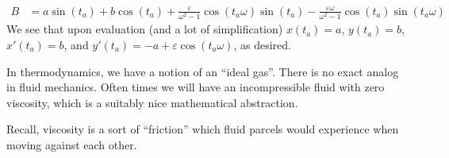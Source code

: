 \begin{node}[Kinematics]
\begin{example}
\begin{subequations}
\begin{align*}
B &= a\sin(t_{a}) + b\cos(t_{a}) +\frac{\varepsilon}{\omega^{2}-1}\cos(t_{a}\omega)\sin(t_{a})-\frac{\varepsilon\omega}{\omega^{2}-1}\cos(t_{a})\sin(t_{a}\omega)
\end{align*}
\end{subequations}
We see that upon evaluation (and a lot of simplification) $x(t_{a})=a$,
$y(t_{a})=b$, $x'(t_{a})=b$, and
$y'(t_{a})=-a+\varepsilon\cos(t_{a}\omega)$, as desired.
\end{example}
\end{node} %

\begin{node}\label{fluids:describing-000N}%
In thermodynamics, we have a notion of an ``ideal gas''. There is no
exact analog in fluid mechanics. Often times we will have an
incompressible fluid with zero viscosity, which is a suitably nice
mathematical abstraction.

Recall, viscosity is a sort of ``friction'' which fluid parcels would
experience when moving against each other.
\end{node}
